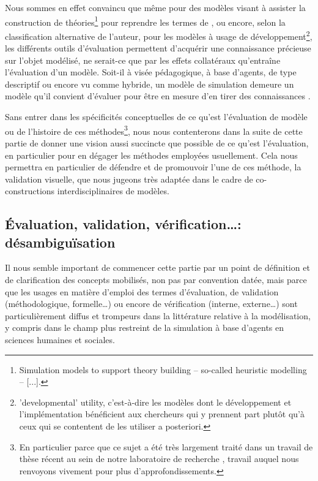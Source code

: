 Nous sommes en effet convaincu que même pour des modèles visant à \og assister la construction de théories\fg{}\footnote{ \og [...] Simulation models to support theory building -- so-called heuristic modelling -- [...].\fg{}} pour reprendre les termes de \cite[260]{lake_trends_2014}, ou encore, selon la classification alternative de l'auteur, pour les modèles à usage \og de développement\fg{}\footnote{\og 'developmental' utility\fg{}, c'est-à-dire les modèles dont le développement et l'implémentation bénéficient aux chercheurs qui y prennent part plutôt qu'à ceux qui se contentent de les utiliser a posteriori.}, les différents outils d'évaluation permettent d'acquérir une connaissance précieuse sur l'objet modélisé, ne serait-ce que par les effets collatéraux qu'entraîne l'évaluation d'un modèle.
Soit-il à visée pédagogique, à base d'agents, de type descriptif ou encore vu comme \og hybride\fg{}, un modèle de simulation demeure un modèle qu'il convient d'évaluer pour être en mesure d'en tirer des connaissances \autocite[299-300]{sargent_history_2017}.

Sans entrer dans les spécificités conceptuelles de ce qu'est l'évaluation de modèle ou de l'histoire de ces méthodes\footnote{En particulier parce que ce sujet a été très largement traité dans un travail de thèse récent au sein de notre laboratoire de recherche \autocite[pp. 58--184]{rey-coyrehourcq_plateforme_2015}, travail auquel nous renvoyons vivement pour plus d'approfondissements.}, nous nous contenterons dans la suite de cette partie de donner une vision aussi succincte que possible de ce qu'est l'évaluation, en particulier pour en dégager les méthodes employées usuellement.
Cela nous permettra en particulier de défendre et de promouvoir l'une de ces méthode, la validation visuelle, que nous jugeons très adaptée dans le cadre de co-constructions interdisciplinaires de modèles.

\subsection{Évaluation, validation, vérification\ldots : désambiguïsation}

Il nous semble important de commencer cette partie par un point de définition et de clarification des concepts mobilisés, non pas par convention datée, mais parce que les usages en matière d'emploi des termes d'évaluation, de validation (méthodologique, formelle\ldots) ou encore de vérification (interne, externe\ldots) sont particulièrement diffus et trompeurs dans la littérature relative à la modélisation, y compris dans le champ plus restreint de la simulation à base d'agents en sciences humaines et sociales.

